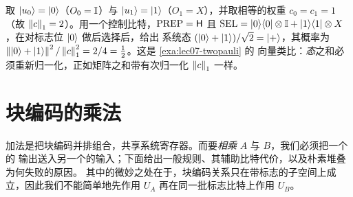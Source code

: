 \begin{example}
\label{exa:lec07-vecadd}
取 $\ket{u_0}=\ket0$（$O_0=\mathbb{I}$）与 $\ket{u_1}=\ket1$（$O_1=X$），并取相等的权重
$c_0=c_1=1$（故 $\left\lVert c \right\rVert_1=2$）。用一个控制比特，$\mathrm{PREP}=\mathsf{H}$ 且
$\mathrm{SEL}=\ket{0}\!\bra{0}\otimes\mathbb{I}+\ket{1}\!\bra{1}\otimes X$，在对标志位 $\ket0$ 做后选择后，给出
系统态 $(\ket0+\ket1)/\sqrt2=\ket+$，其概率为
$\left\lVert \ket0+\ket1 \right\rVert^2/\left\lVert c \right\rVert_1^2=2/4=\tfrac12$。这是 \cref{exa:lec07-twopauli} 的
向量类比：\emph{态}之和必须重新归一化，正如矩阵之和带有次归一化 $\left\lVert c \right\rVert_1$ 一样。
\end{example}

\section{块编码的乘法}
\label{sec:lec07-3}

加法是把块编码并排组合，共享系统寄存器。而要\emph{相乘} $A$ 与 $B$，我们必须把一个的
输出送入另一个的输入；下面给出一般规则、其辅助比特代价，以及朴素堆叠为何失败的原因。
其中的微妙之处在于，块编码关系只在带标志的子空间上成立，因此我们不能简单地先作用
$U_A$ 再在同一批标志比特上作用 $U_B$。

